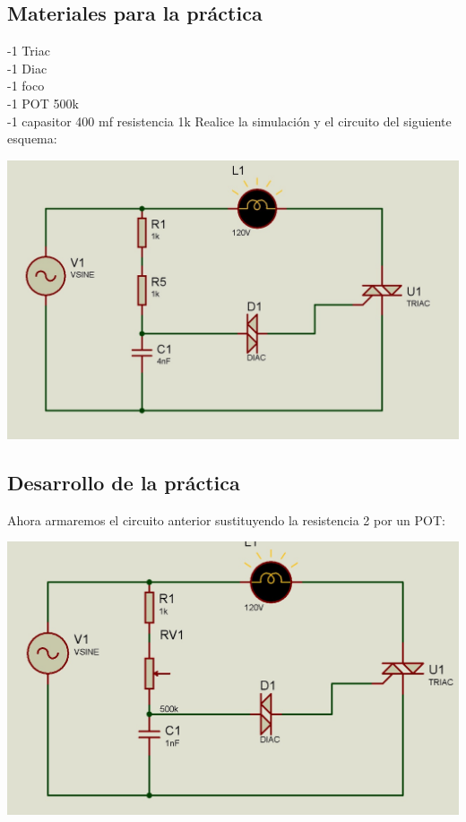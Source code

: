 \documentclass[12pt,a4paper]{article}
\begin{document}
\newpage
\begin{center}
\section{Materiales para la práctica}
\end{center}
\begin{flushleft}
-1 Triac\\
-1 Diac\\
-1 foco \\
-1 POT 500k\\
-1 capasitor 400 mf  resistencia 1k
Realice la simulación y el circuito del siguiente esquema:\\
\end{flushleft}
\includegraphics[scale=0.4]{imagenes/circuito.JPG}
\begin{flushleft}
\subsection{Desarrollo de la práctica}
Ahora armaremos el circuito anterior sustituyendo la resistencia 2 por un POT:
\begin{center}
\includegraphics[scale=0.3]{imagenes/circuito1.JPG} \\
\end{center}
\end{flushleft}
\newpage
\end{document}
